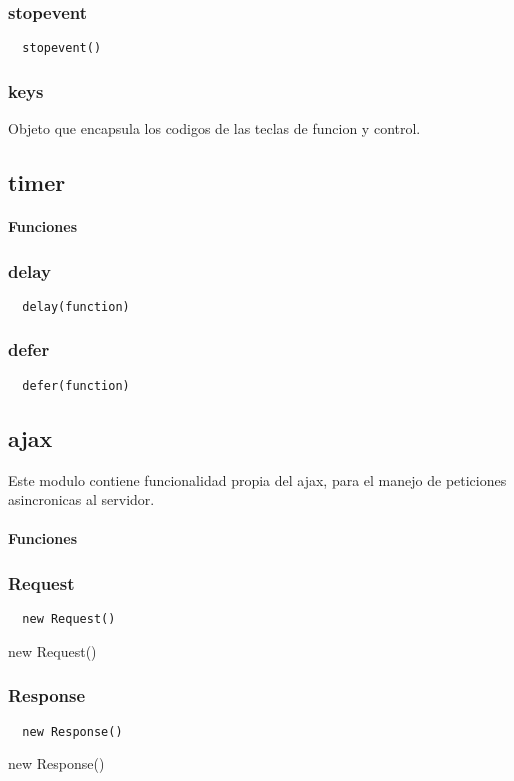 \subsubsection*{stopevent}
\begin{verbatim}
  stopevent()
\end{verbatim}

\subsubsection*{keys}
Objeto que encapsula los codigos de las teclas de funcion y control.

\subsection{timer}

\paragraph{Funciones}
\subsubsection*{delay}
\begin{verbatim}
  delay(function)
\end{verbatim}

\subsubsection*{defer}
\begin{verbatim}
  defer(function)
\end{verbatim}

\subsection{ajax}
Este modulo contiene funcionalidad propia del ajax, para el manejo de peticiones asincronicas al servidor.
\paragraph{Funciones}
\subsubsection*{Request}
\begin{verbatim}
  new Request()
\end{verbatim}
new Request()
\subsubsection*{Response}
\begin{verbatim}
  new Response()
\end{verbatim}
new Response()
